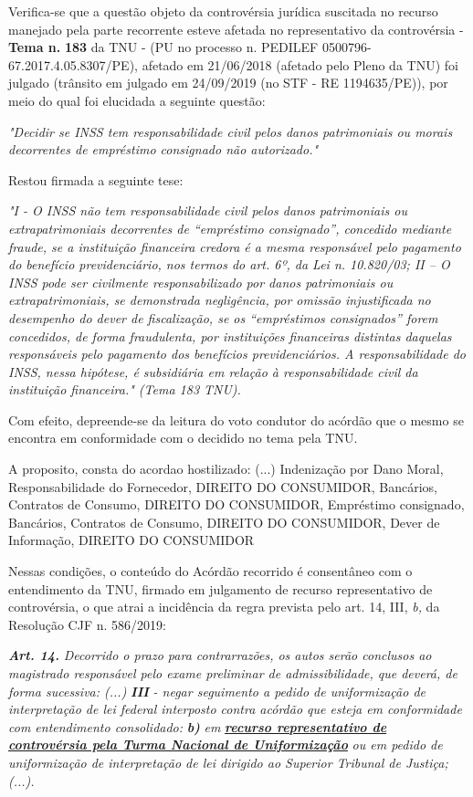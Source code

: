 \documentclass[12pt]{article}
\begin{document}
\justifying
\noindent Verifica-se que a questão objeto da controvérsia jurídica suscitada no recurso manejado pela parte recorrente esteve afetada no representativo da controvérsia - \textbf{Tema n. }\textbf{183} da TNU - (PU no processo n. PEDILEF 0500796-67.2017.4.05.8307/PE),  afetado em 21/06/2018 (afetado pelo Pleno da TNU) foi julgado (trânsito em julgado em 24/09/2019 (no STF - RE 1194635/PE)), por meio do qual foi elucidada a seguinte questão:

\noindent \textit{"Decidir se INSS tem responsabilidade civil pelos danos patrimoniais ou morais decorrentes de empréstimo consignado não autorizado."}

\noindent Restou firmada a seguinte tese:

\noindent \textit{"I - O INSS não tem responsabilidade civil pelos danos patrimoniais ou extrapatrimoniais decorrentes de “empréstimo consignado”, concedido mediante fraude, se a instituição financeira credora é a mesma responsável pelo pagamento do benefício previdenciário, nos termos do art. 6º, da Lei n. 10.820/03; II – O INSS pode ser civilmente responsabilizado por danos patrimoniais ou extrapatrimoniais, se demonstrada negligência, por omissão injustificada no desempenho do dever de fiscalização, se os “empréstimos consignados” forem concedidos, de forma fraudulenta, por instituições financeiras distintas daquelas responsáveis pelo pagamento dos benefícios previdenciários. A responsabilidade do INSS, nessa hipótese, é subsidiária em relação à responsabilidade civil da instituição financeira." (Tema 183 TNU).}

\noindent Com efeito, depreende-se da leitura do voto condutor do acórdão que o mesmo se encontra em conformidade com o decidido no  tema pela TNU.

\noindent A proposito, consta do acordao hostilizado: (...) Indenização por Dano Moral, Responsabilidade do Fornecedor, DIREITO DO CONSUMIDOR, Bancários, Contratos de Consumo, DIREITO DO CONSUMIDOR, Empréstimo consignado, Bancários, Contratos de Consumo, DIREITO DO CONSUMIDOR, Dever de Informação, DIREITO DO CONSUMIDOR

\noindent Nessas condições, o conteúdo do Acórdão recorrido é consentâneo com o entendimento da TNU, firmado em julgamento de recurso representativo de controvérsia, o que atrai a incidência da regra prevista pelo art. 14, III, \textit{b,} da Resolução CJF n. 586/2019:

\noindent \textit{\textbf{Art. 14.}}\textit{ Decorrido o prazo para contrarrazões, os autos serão conclusos ao magistrado responsável pelo exame preliminar de admissibilidade, que deverá, de forma sucessiva: (...) }\textit{\textbf{III }}\textit{- negar seguimento a pedido de uniformização de interpretação de lei federal interposto contra acórdão que esteja em conformidade com entendimento consolidado: }\textit{\textbf{b)}}\textit{ em }\uline{\textit{\textbf{recurso representativo de controvérsia pela Turma Nacional de Uniformização}}}\textit{ ou em pedido de uniformização de interpretação de lei dirigido ao Superior Tribunal de Justiça;(...).}
\end{document}
